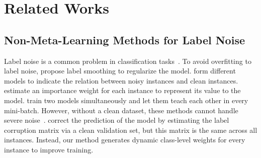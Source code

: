 \section{Related Works}
\subsection{Non-Meta-Learning Methods for Label Noise}
%
Label noise is a common problem in classification tasks~\cite{zhuClassNoiseVs2004a,frenayClassificationPresenceLabel2014a,alganLabelNoiseTypes2020b}.
%
To avoid overfitting to label noise, \cite{szegedyRethinkingInceptionArchitecture2016a} propose label smoothing to regularize the model.
%
\cite{goldbergerTrainingDeepNeuralnetworks2017,vahdatRobustnessLabelNoise2017a} form different models to indicate the relation between noisy instances and clean instances.
%
\cite{liuClassificationNoisyLabels2014} estimate an importance weight for each instance to represent its value to the model.
%
\cite{hanCoteachingRobustTraining2018a} train two models simultaneously and let them teach each other in every mini-batch.
%
However, without a clean dataset, these methods cannot handle severe noise~\cite{renLearningReweightExamples2018}.
%
\cite{hendrycksUsingTrustedData2018} correct the prediction of the model by estimating the label corruption matrix via a clean validation set, but this matrix is the same across all instances.
%
Instead, our method generates dynamic class-level weights for every instance to improve training.

